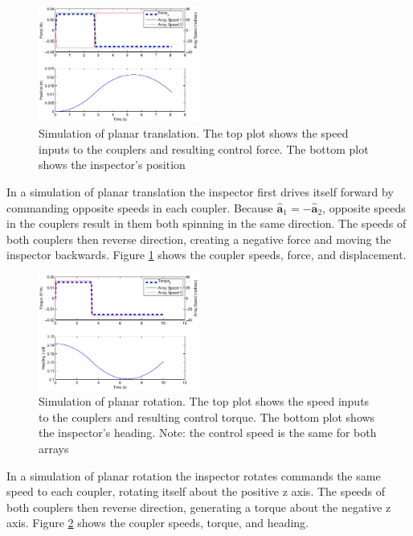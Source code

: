 \documentclass[letterpaper, 10 pt, conference]{ieeeconf}  %
\begin{document}
     \begin{figure}[thpb]
      	\centering
  		\includegraphics[width = 0.47\textwidth]{figures/planar_translation_sim.eps}
      		\caption{Simulation of planar translation. The top plot shows the speed inputs to the couplers and resulting control force. The bottom plot shows the inspector's position}
      		\label{fig:planar_translation_sim}
   \end{figure}
   
In a simulation of planar translation the inspector first drives itself forward by commanding opposite speeds in each coupler. Because $\hat{\textbf{a}}_1 = -\hat{\textbf{a}}_2$, opposite speeds in the couplers result in them both spinning in the same direction. The speeds of both couplers then reverse direction, creating a negative force and moving the inspector backwards. Figure \ref{fig:planar_translation_sim} shows the coupler speeds, force, and displacement. 

     \begin{figure}[thpb]
      \centering
      \includegraphics[width = 0.47\textwidth]{figures/planar_rotation_sim.eps}
      \caption{Simulation of planar rotation. The top plot shows the speed inputs to the couplers and resulting control torque. The bottom plot shows the inspector's heading. Note: the control speed is the same for both arrays}
      \label{fig:planar_rotation_sim}
   \end{figure}
   
In a simulation of planar rotation the inspector rotates commands the same speed to each coupler, rotating itself about the positive z axis. The speeds of both couplers then reverse direction, generating a torque about the negative z axis. Figure \ref{fig:planar_rotation_sim} shows the coupler speeds, torque, and heading. 
\end{document}
